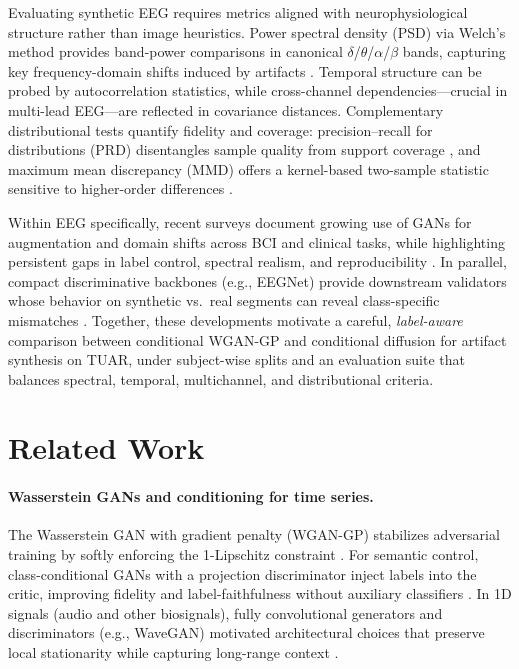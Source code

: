 \documentclass{article}
\begin{document}
Evaluating synthetic EEG requires metrics aligned with neurophysiological structure rather than image heuristics. Power spectral density (PSD) via Welch’s method provides band-power comparisons in canonical $\delta$/$\theta$/$\alpha$/$\beta$ bands, capturing key frequency-domain shifts induced by artifacts \citep{welch1967fft}. Temporal structure can be probed by autocorrelation statistics, while cross-channel dependencies—crucial in multi-lead EEG—are reflected in covariance distances. Complementary distributional tests quantify fidelity and coverage: precision–recall for distributions (PRD) disentangles sample quality from support coverage \citep{sajjadi2018assessing}, and maximum mean discrepancy (MMD) offers a kernel-based two-sample statistic sensitive to higher-order differences \citep{binkowski2018demystifying}. 

Within EEG specifically, recent surveys document growing use of GANs for augmentation and domain shifts across BCI and clinical tasks, while highlighting persistent gaps in label control, spectral realism, and reproducibility \citep{habashi2023ganeeg}. In parallel, compact discriminative backbones (e.g., EEGNet) provide downstream validators whose behavior on synthetic vs.\ real segments can reveal class-specific mismatches \citep{lawhern2018eegnet}. Together, these developments motivate a careful, \emph{label-aware} comparison between conditional WGAN-GP and conditional diffusion for artifact synthesis on TUAR, under subject-wise splits and an evaluation suite that balances spectral, temporal, multichannel, and distributional criteria.


\section{Related Work}

\paragraph{Wasserstein GANs and conditioning for time series.}
The Wasserstein GAN with gradient penalty (WGAN-GP) stabilizes adversarial training by softly enforcing the 1-Lipschitz constraint \citep{gulrajani2017improved}. For semantic control, class-conditional GANs with a projection discriminator inject labels into the critic, improving fidelity and label-faithfulness without auxiliary classifiers \citep{miyato2018cgans}. In 1D signals (audio and other biosignals), fully convolutional generators and discriminators (e.g., WaveGAN) motivated architectural choices that preserve local stationarity while capturing long-range context \citep{donahue2018wavegan}. 
\end{document}
